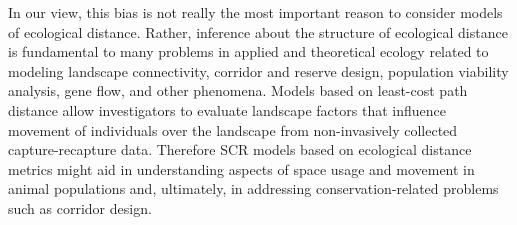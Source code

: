 In our view, this bias is not really the most important reason to
consider models of ecological distance. Rather, inference about the
structure of ecological distance is fundamental to many problems in
applied and theoretical ecology related to modeling landscape
connectivity, corridor and reserve design, population viability
analysis, gene flow, and other phenomena.  Models based on least-cost
path distance allow 
investigators to evaluate landscape factors that influence movement of
individuals over the landscape from non-invasively collected
capture-recapture data.  Therefore SCR models based on ecological
distance metrics might aid in understanding
aspects of space usage and movement in animal populations and, ultimately, in addressing conservation-related problems such as corridor design.

